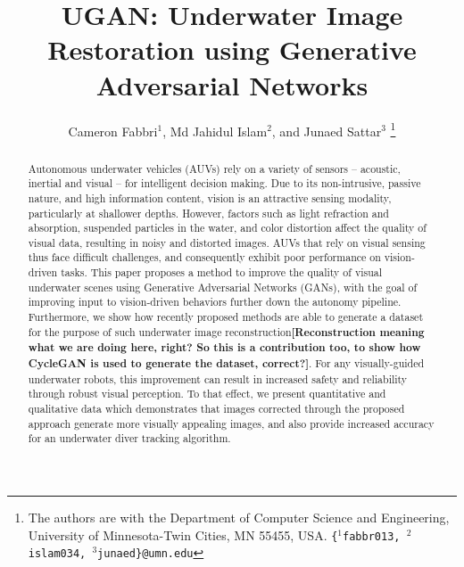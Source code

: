 \documentclass[letterpaper, 10pt, conference]{ieeeconf}
\title{UGAN: Underwater Image Restoration using Generative Adversarial Networks}
\author{Cameron Fabbri$^{1}$, Md Jahidul Islam$^{2}$, and Junaed Sattar$^{3}$
\thanks{				
  The authors are with the Department of Computer Science and Engineering, University of Minnesota-Twin  Cities, MN 55455, USA. \newline
 {\tt\small\{$^{1}$fabbr013, $^{2}$islam034, $^{3}$junaed\}@umn.edu}
}
}
\newcommand{\marginlabel}[1]{\mbox{}\marginpar[\raggedleft\hspace{0pt}{#1}]{
\raggedright\hspace{0pt}{#1}}}
\newcommand{\starnote}[1]{\marginlabel{$\bigstar$}\textbf{[#1]}}
\begin{document}
\maketitle

\begin{abstract}
Autonomous underwater vehicles (AUVs) rely on a variety of sensors -- acoustic, inertial and visual -- for intelligent decision making. Due
to its non-intrusive, passive nature, and high information content, vision is an attractive sensing modality, particularly at shallower
depths. However, factors such as light refraction and absorption, suspended particles in the water, and color distortion affect the quality
of visual data, resulting in noisy and distorted images. AUVs that rely on visual sensing thus face difficult challenges, and consequently
exhibit poor performance on vision-driven tasks. This paper proposes a method to improve the quality of visual underwater scenes using
Generative Adversarial Networks (GANs), with the goal of improving input to vision-driven behaviors further down the autonomy
pipeline. Furthermore, we show how recently proposed methods are able to generate a dataset for the purpose of such underwater image
reconstruction\starnote{Reconstruction meaning what we are doing here, right? So this is a contribution too, to show how CycleGAN is used to
generate the dataset, correct?}. For any visually-guided underwater robots, this improvement can result in increased safety and reliability
through robust visual perception. To that effect, we present quantitative and qualitative data which demonstrates that images corrected
through the proposed approach generate more visually appealing images, and also provide increased accuracy for an underwater diver tracking
algorithm.
\end{abstract}

\end{document}
